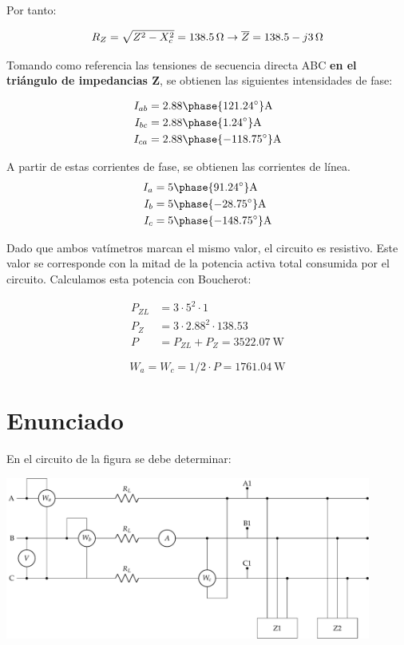Por tanto:

\[
  R_Z = \sqrt{Z^2 - X_c^2} = \SI{138.5}{\ohm} \rightarrow \overline{Z} = \SI[parse-numbers=false]{138.5 - j3}{\ohm}
\]

Tomando como referencia las tensiones de secuencia directa ABC
\textbf{en el triángulo de impedancias Z}, se obtienen las siguientes
intensidades de fase:

\begin{align*}
  I_{ab} &= {2.88\phase{121.24^\circ}}\unit{\ampere}\\
  I_{bc} &= {2.88\phase{1.24^\circ}}\unit{\ampere}\\
  I_{ca} &= {2.88\phase{-118.75^\circ}}\unit{\ampere}\\
\end{align*}

A partir de estas corrientes de fase, se obtienen las corrientes de línea.
\begin{align*}
  I_{a} &= {5\phase{91.24^\circ}}\unit{\ampere}\\
  I_{b} &= {5\phase{-28.75^\circ}}\unit{\ampere}\\
  I_{c} &= {5\phase{-148.75^\circ}}\unit{\ampere}
\end{align*}



Dado que ambos vatímetros marcan el mismo valor, el circuito es
resistivo. Este valor se corresponde con la mitad de la potencia
activa total consumida por el circuito. Calculamos esta potencia con Boucherot:


\begin{align*}
  P_{ZL} &= 3 \cdot 5^2 \cdot 1\\
  P_Z &= 3 \cdot 2.88^2 \cdot 138.53\\
  P &= P_{ZL} + P_{Z} = \SI{3522.07}{\watt}
\end{align*}

\[
  W_a = W_c = 1/2 \cdot P = \SI{1761.04}{\watt}
\]



\section{Enunciado}

En el circuito de la figura se debe determinar:

\begin{center}
  \includegraphics[width=0.9\textwidth]{figuras/BT3_11.pdf}
\end{center}

